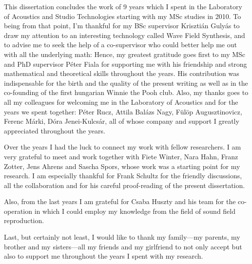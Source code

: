 This dissertation concludes the work of 9 years which I spent in the Laboratory of Acoustics and Studio Technologies starting with my MSc studies in 2010.
To being from that point, I'm thankful for my BSc supervisor Krisztián Gulyás to draw my attention to an interesting technology called Wave Field Synthesis, and to advise me to seek the help of a co-supervisor who could better help me out with all the underlying math:
Hence, my greatest gratitude goes first to my MSc and PhD supervisor Péter Fiala for supporting me with his friendship and strong mathematical and theoretical skills throughout the years.
His contribution was indispensable for the birth and the quality of the present writing as well as in the co-founding of the first hungarian Winnie the Pooh club.
Also, my thanks goes to all my colleagues for welcoming me in the Laboratory of Acoustics and for the years we spent together: Péter Rucz, Attila Balázs Nagy, Fülöp Augusztinovicz, Ferenc Márki, Dóra Jenei-Kulcsár, all of whose company and support I greatly appreciated throughout the years.

Over the years I had the luck to connect my work with fellow researchers.
I am very grateful to meet and work together with Fiete Winter, Nara Hahn, Franz Zotter, Jens Ahrens and Sascha Spors, whose work was a starting point for my research.
I am especially thankful for Frank Schultz for the friendly discussions, all the collaboration and for his careful proof-reading of the present dissertation.

Also, from the last years I am grateful for Csaba Huszty and his team for the co-operation in which I could employ my knowledge from the field of sound field reproduction.

Last, but certainly not least, I would like to thank my family---my parents, my brother and my sisters---all my friends and my girlfriend to not only accept but also to support me throughout the years I spent with my research.